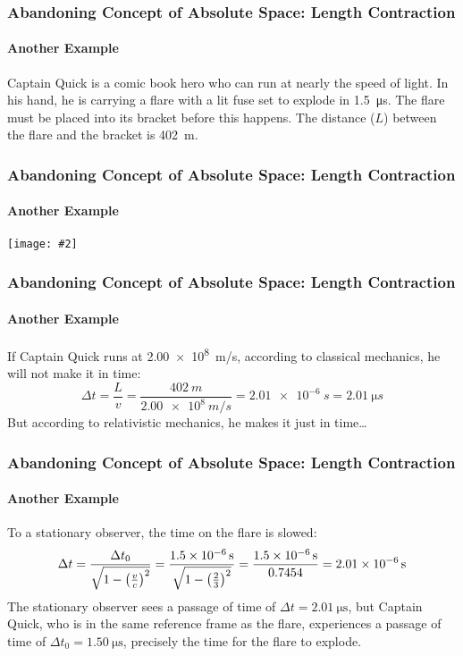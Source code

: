 \documentclass[12pt,compress,aspectratio=169]{beamer}
\newcommand{\pic}[2]{\texttt{[image: \#2]}}
\newcommand{\bigsqrt}{\ensuremath\sqrt{1-\left(\frac{v}{c}\right)^2}}
\begin{document}
\begin{frame}
  \frametitle{Abandoning Concept of Absolute Space: Length Contraction}
  \framesubtitle{Another Example}
  Captain Quick is a comic book hero who can run at nearly the speed of light.
  In his hand, he is carrying a flare with a lit fuse set to explode in
  \SI{1.5}{\micro\second}. The flare must be placed into its bracket before this
  happens. The distance ($L$) between the flare and the bracket is
  \SI{402}{\metre}.
\end{frame}

\begin{frame}
  \frametitle{Abandoning Concept of Absolute Space: Length Contraction}
  \framesubtitle{Another Example}
  \begin{center}
    \pic{0.85}{graphics/captain-quick.png}
  \end{center}
\end{frame}


\begin{frame}
  \frametitle{Abandoning Concept of Absolute Space: Length Contraction}
  \framesubtitle{Another Example}
  If Captain Quick runs at \SI{2.00e8}{m/s}, according to classical mechanics,
  he will not make it in time:
  \begin{displaymath}
    \Delta t= \frac{L}{v}=\frac{\SI{402}{m}}{\SI{2.00e8}{m/s}}
    =\SI{2.01e-6}{s}=\SI{2.01}{\micro s}
  \end{displaymath}
  But according to relativistic mechanics, he makes it just in time\ldots
\end{frame}

\begin{frame}
  \frametitle{Abandoning Concept of Absolute Space: Length Contraction}
  \framesubtitle{Another Example}
  To a stationary observer, the time on the flare is slowed:
  \begin{displaymath}
    \Delta t 
    = \frac{\Delta t_0}{\bigsqrt}
    = \frac{\SI{1.5e-6}{s}}{\sqrt{1-\left(\frac{2}{3}\right)^2}}
    = \frac{\SI{1.5e-6}{s}}{0.7454}
    = \SI{2.01e-6}{s}
  \end{displaymath}
  The stationary observer sees a passage of time of
  $\Delta t=\SI{2.01}{\micro\second}$, but
  Captain Quick, who is in the same reference frame as the flare, experiences
  a passage of time of $\Delta t_0=\SI{1.50}{\micro\second}$, precisely the
  time for the flare to explode.
\end{frame}
\end{document}
